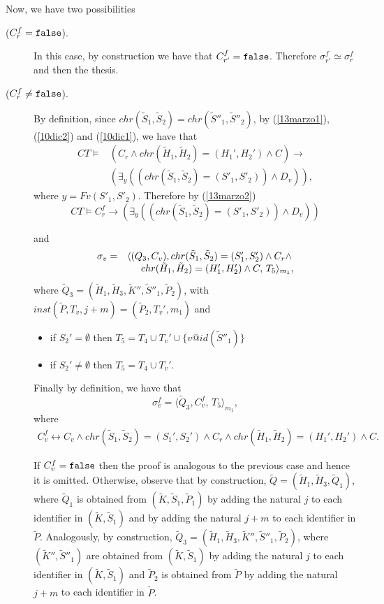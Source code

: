 \documentclass[final]{acmtrans2e}
\newcommand{\la}{\langle}
\newcommand{\ra}{\rangle}
\begin{document}
Now, we have two possibilities
\begin{description}
  \item[($C_{r}^f = \tt false$).] In this case, by construction we have that $C_{r'}^f = \tt false$. Therefore $ \sigma_{r'}^f \simeq  \sigma_{r}^f$ and then the thesis.
  \item[($C_{r}^f    \neq \tt false$).]
  By definition, since
$chr(\tilde S_1, \tilde S_2)=chr(\tilde S''_1, \tilde S''_2)$, by (\ref{13marzo1}), (\ref{10dic2}) and (\ref{10dic1}), we have that
\[\begin{array}{ll}
    CT\models  & (C_r\wedge
     chr(\tilde H_1, \tilde H_2)= (H_1', H_2')\wedge C)
     \rightarrow  \\
     & (\exists_y((chr(\tilde S_1,
\tilde S_2)=(S'_1, S'_2))\wedge D_v)),
  \end{array}
 \]
where $ y=Fv(S'_1, S'_2)$. Therefore
by (\ref{13marzo2})
\[CT\models  C_{r}^f
     \rightarrow  (\exists_y((chr(\tilde S_1,
\tilde S_2)=(S'_1, S'_2))\wedge D_v))
 \]

and
$$\begin{array}{ll}
    \sigma_{v}=&\la (Q_3 ,  C_v),
     chr(\tilde S_1, \tilde S_2)= (S_1', S_2')\wedge C_r\wedge\\
     &\hspace{0.5cm}chr(\tilde H_1, \tilde H_2)= (H_1', H_2')\wedge C, \, T_5\ra_{m_1},
  \end{array}
  $$
     where
     $\tilde Q_3=(\tilde H_1,\tilde H_3,\tilde K'',\tilde S''_1, \tilde P_2)$, with
     $inst (\tilde P, T_v, j+m) = (\tilde P_2, T_v', m_1)$ and
\begin{itemize}
    \item if $S_2'=\emptyset$ then $T_5=T_4 \cup T_v' \cup\{v @id (\tilde
S''_1)\}$
    \item if $S_2'\not =\emptyset$ then $T_5=T_4 \cup T_v'$.
    \end{itemize}
    Finally by definition, we have that
$$
    \sigma_{v}^f=\la \tilde Q_3,C_{v}^f, \, T_5\ra_{m_1},
$$
  where
  $$\begin{array}{l}
    C_{v}^f \leftrightarrow C_v \wedge
     chr(\tilde S_1, \tilde S_2)= (S_1', S_2')\wedge C_r\wedge
     chr(\tilde H_1, \tilde H_2)= (H_1', H_2')\wedge C.
  \end{array}
  $$

  If $C_{v}^f =\tt false $ then the proof is analogous to the previous case and hence it is omitted.
  Otherwise, observe that by construction,
$\tilde Q=(\tilde H_1,\tilde H_3,\tilde Q_1)$, where
$\tilde Q_1$ is obtained from $(\tilde K,\tilde S_1,\tilde P_1)$ by adding the natural $j$ to each identifier in
$(\tilde K,\tilde S_1)$ and by adding the natural $j+m$ to each identifier in
$\tilde P$.
Analogously, by construction,
$\tilde Q_3=(\tilde H_1,\tilde H_3,\tilde K'',\tilde S''_1, \tilde P_2)$, where
$(\tilde K'',\tilde S''_1)$  are obtained from $(\tilde K,\tilde S_1)$ by adding the natural $j$ to each identifier in
$(\tilde K,\tilde S_1)$ and $\tilde P_2$ is obtained from $\tilde P$ by adding the natural  $j+m$ to each identifier in $\tilde P$.


\end{description}
\end{document}
